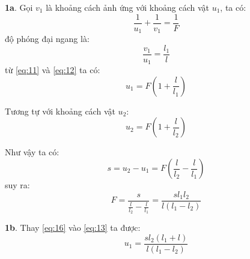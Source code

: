 \noindent \textbf{1a}. Gọi $v_{1}$ là khoảng cách ảnh ứng với khoảng cách vật $u_{1}$, ta có:
\begin{equation}
  \label{eq:11}
  \frac{1}{u_{1}}+\frac{1}{v_{1}}=\frac{1}{F}
\end{equation}
độ phóng đại ngang là:
\begin{equation}
  \label{eq:12}
  \frac{v_{1}}{u_{1}}=\frac{l_{1}}{l}
\end{equation}
từ \eqref{eq:11} và \eqref{eq:12} ta có:
\begin{equation}
  \label{eq:13}
  u_{1}=F\left(1+\frac{l}{l_{1}}\right)
\end{equation}

\noindent Tương tự với khoảng cách vật $u_{2}$:
\begin{equation}
  \label{eq:14}
  u_{2}=F\left(1+\frac{l}{l_{2}}\right)
\end{equation}

\noindent Như vậy ta có:
\begin{equation}
  \label{eq:15}
  s=u_{2}-u_{1}=F\left(\frac{l}{l_{2}}-\frac{l}{l_{1}}\right)
\end{equation}
suy ra:
\begin{equation}
  \label{eq:16}
  F=\frac{s}{\frac{l}{l_{2}}-\frac{l}{l_{1}}}=\frac{sl_{1}l_{2}}{l(l_{1}-l_{2})}
\end{equation}

\noindent \textbf{1b}. Thay \eqref{eq:16} vào \eqref{eq:13} ta được:
\begin{equation}
  \label{eq:17}
  u_{1}=\frac{sl_{2}(l_{1}+l)}{l(l_{1}-l_{2})}
\end{equation}

